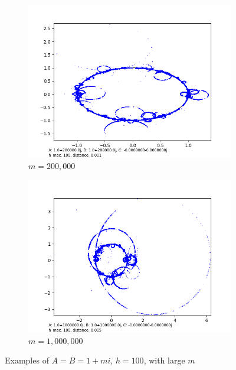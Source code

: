 \documentclass[12pt,a4paper,reqno,parskip=full]{amsart}
\numberwithin{equation}{section}
\theoremstyle{plain}
\theoremstyle{definition}
\begin{document}
\begin{figure}[H]
     \begin{subfigure}[b]{0.49\textwidth}
         \centering
         \includegraphics[width=\textwidth]{images/m/a200,000,b200,000,h100,d.0010.png}
         \caption{$m=200,000$}
         \label{fig:m200,000}
     \end{subfigure}
     \begin{subfigure}[b]{0.49\textwidth}
         \centering
         \includegraphics[width=\textwidth]{images/m/a1,000,000,b1,000,000,h100,d.005.png}
         \caption{$m=1,000,000$}
         \label{fig:m1,000,000}
     \end{subfigure}
     
        \caption{Examples of $A=B=1+mi$, $h=100$, with large $m$}
        \label{fig:large-m2}
\end{figure}
\end{document}
